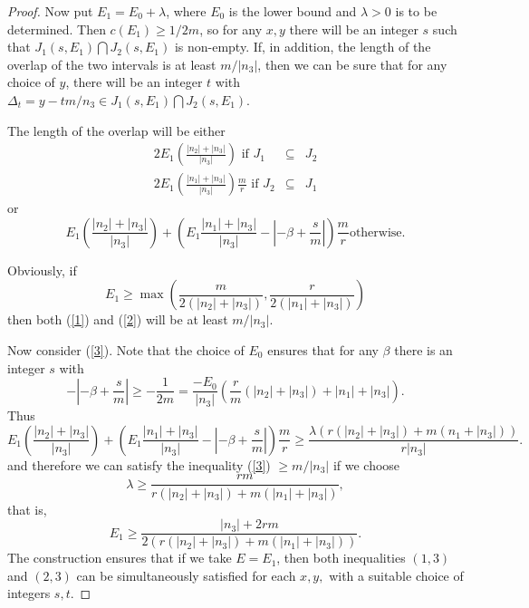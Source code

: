 \documentclass{amsart}
\begin{document}
\begin{proof}
Now put $E_{1}=E_{0}+\lambda $, where $E_{0}$ is the lower bound and $\lambda >0$ is to be determined. Then $c(E_{1})\geq 1/2m$, so for any $x,y$
there will be an integer $s$ such that $J_{1}(s,E_{1}){\bigcap}
J_{2}(s,E_{1}) $ is non-empty. If, in addition, the length of the overlap of
the two intervals is at least $m/\left\vert n_{3}\right\vert $, then we can
be sure that for any choice of $y$, there will be an integer $t$ with $\Delta _{t}=y-tm/n_{3}\in J_{1}(s,E_{1}){\bigcap} J_{2}(s,E_{1})$.

The length of the overlap will be either\begin{eqnarray}
2E_{1}\left( \frac{\left\vert n_{2}\right\vert +\left\vert n_{3}\right\vert
}{\left\vert n_{3}\right\vert }\right) \text{ if }J_{1} &\subseteq &J_{2}
\label{1} \\
2E_{1}\left( \frac{\left\vert n_{1}\right\vert +\left\vert n_{3}\right\vert
}{\left\vert n_{3}\right\vert }\right) \frac{m}{r}\text{ if }J_{2}
&\subseteq &J_{1}  \label{2}
\end{eqnarray}or\begin{equation}
E_{1}\left( \frac{\left\vert n_{2}\right\vert +\left\vert n_{3}\right\vert }{\left\vert n_{3}\right\vert }\right) +\left( E_{1}\frac{\left\vert
n_{1}\right\vert +\left\vert n_{3}\right\vert }{\left\vert n_{3}\right\vert }-\left\vert -\beta +\frac{s}{m}\right\vert \right) \frac{m}{r}\text{
otherwise.}  \label{3}
\end{equation}

Obviously, if
$$
E_{1}\geq \max \left( \frac{m}{2(\left\vert n_{2}\right\vert +\left\vert
n_{3}\right\vert )},\frac{r}{2(\left\vert n_{1}\right\vert +\left\vert
n_{3}\right\vert )}\right)
$$
then both (\ref{1}) and (\ref{2}) will be at least $m/\left\vert
n_{3}\right\vert $.

Now consider (\ref{3}). Note that the choice of $E_{0}$ ensures that for any
$\beta $ there is an integer $s$ with
$$
-\left\vert -\beta +\frac{s}{m}\right\vert \geq -\frac{1}{2m}=\frac{-E_{0}}{\left\vert n_{3}\right\vert }\left( \frac{r}{m}(\left\vert n_{2}\right\vert
+\left\vert n_{3}\right\vert )+\left\vert n_{1}\right\vert +\left\vert
n_{3}\right\vert \right) .
$$
Thus
$$
E_{1}\left( \frac{\left\vert n_{2}\right\vert +\left\vert n_{3}\right\vert }{\left\vert n_{3}\right\vert }\right) +\left( E_{1}\frac{\left\vert
n_{1}\right\vert +\left\vert n_{3}\right\vert }{\left\vert n_{3}\right\vert }-\left\vert -\beta +\frac{s}{m}\right\vert \right) \frac{m}{r}\geq \frac{\lambda \left( r(\left\vert n_{2}\right\vert +\left\vert n_{3}\right\vert
)+m(n_{1}+\left\vert n_{3}\right\vert )\right) }{r\left\vert
n_{3}\right\vert }.
$$
and therefore we can satisfy the inequality (\ref{3}) $\geq m/\left\vert
n_{3}\right\vert $ if we choose
$$
\lambda \geq \frac{rm}{r(\left\vert n_{2}\right\vert +\left\vert
n_{3}\right\vert )+m(\left\vert n_{1}\right\vert +\left\vert
n_{3}\right\vert )},
$$
that is,
$$
E_{1}\geq \frac{\left\vert n_{3}\right\vert +2rm}{2\left( r(\left\vert
n_{2}\right\vert +\left\vert n_{3}\right\vert )+m(\left\vert
n_{1}\right\vert +\left\vert n_{3}\right\vert )\right) }.
$$
The construction ensures that if we take $E=E_{1}$, then both inequalities $(1,3)$ and $(2,3)$ can be simultaneously satisfied for each $x,y,$ with a
suitable choice of integers $s,t$.


\end{proof}
\end{document}

